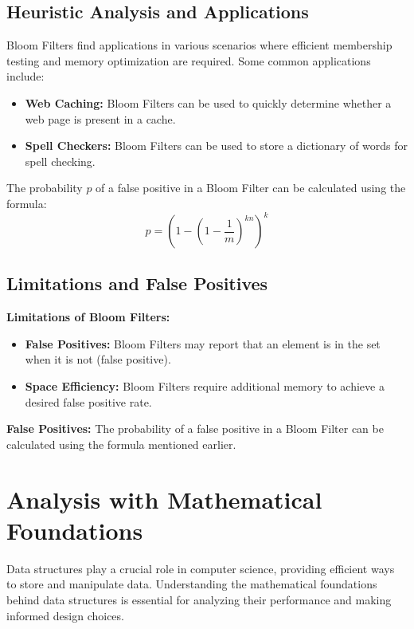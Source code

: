 \documentclass[12pt]{book} %
\begin{document}
\subsection{Heuristic Analysis and Applications}
Bloom Filters find applications in various scenarios where efficient membership testing and memory optimization are required. Some common applications include:
\begin{itemize}
    \item \textbf{Web Caching:} Bloom Filters can be used to quickly determine whether a web page is present in a cache.
    \item \textbf{Spell Checkers:} Bloom Filters can be used to store a dictionary of words for spell checking.
\end{itemize}

The probability \( p \) of a false positive in a Bloom Filter can be calculated using the formula:
\[ p = \left(1 - \left(1 - \frac{1}{m}\right)^{kn}\right)^k \]

\subsection{Limitations and False Positives}
\textbf{Limitations of Bloom Filters:}
\begin{itemize}
    \item \textbf{False Positives:} Bloom Filters may report that an element is in the set when it is not (false positive).
    \item \textbf{Space Efficiency:} Bloom Filters require additional memory to achieve a desired false positive rate.
\end{itemize}

\textbf{False Positives:} The probability of a false positive in a Bloom Filter can be calculated using the formula mentioned earlier.

\section{Analysis with Mathematical Foundations}
Data structures play a crucial role in computer science, providing efficient ways to store and manipulate data. Understanding the mathematical foundations behind data structures is essential for analyzing their performance and making informed design choices.
\end{document}
